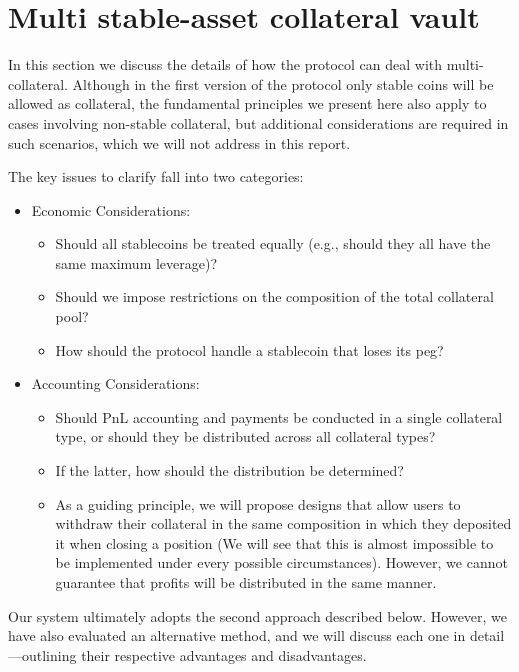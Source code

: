 \documentclass{article}
\begin{document}
\section{Multi stable-asset collateral vault}\label{vault}

In this section we discuss the details of how the protocol can deal with multi-collateral. Although in the first version of the protocol only stable coins will be allowed as collateral, the fundamental principles we present here also apply to cases involving non-stable collateral, but additional considerations are required in such scenarios, which we will not address in this report.

The key issues to clarify fall into two categories:
\begin{itemize}
\item Economic Considerations:

	\begin{itemize}
	\item Should all stablecoins be treated equally (e.g., should they all have the same maximum leverage)?
	\item Should we impose restrictions on the composition of the total collateral pool?
	\item How should the protocol handle a stablecoin that loses its peg?
	\end{itemize}
	
\item Accounting Considerations:

	\begin{itemize}
	\item Should PnL accounting and payments be conducted in a single collateral type, or should they be distributed across all collateral types?
	\item If the latter, how should the distribution be determined?
	\item As a guiding principle, we will propose designs that allow users to withdraw their collateral in the same composition in which they 	deposited it when closing a position (We will see that this is almost impossible to be implemented under every possible circumstances). However, we cannot guarantee that profits will be distributed in the same manner.
	\end{itemize}
	
\end{itemize}

Our system ultimately adopts the second approach described below. However, we have also evaluated an alternative method, and we will discuss each one in detail—outlining their respective advantages and disadvantages.
\end{document}
